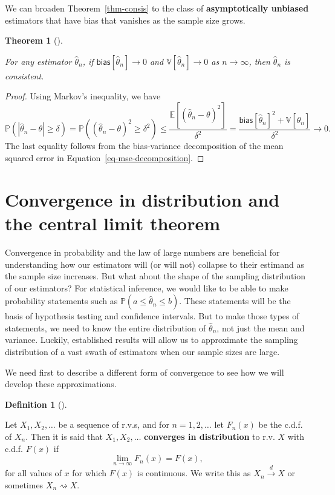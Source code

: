 \documentclass[
  13pt,
  letterpaper,
  DIV=11,
  numbers=noendperiod]{scrreprt}
\newcommand{\E}{\mathbb{E}}
\newcommand{\V}{\mathbb{V}}
\renewcommand{\P}{\mathbb{P}}
\newcommand{\indist}{\overset{d}{\to}}
\theoremstyle{plain}
\newtheorem{theorem}{Theorem}[chapter]
\theoremstyle{plain}
\theoremstyle{definition}
\newtheorem{definition}{Definition}[chapter]
\theoremstyle{definition}
\theoremstyle{remark}
\begin{document}
We can broaden Theorem~\ref{thm-consis} to the class of
\textbf{asymptotically unbiased} estimators that have bias that vanishes
as the sample size grows.

\begin{theorem}[]\protect\hypertarget{thm-consis-2}{}\label{thm-consis-2}

For any estimator \(\widehat{\theta}_n\), if
\(\textsf{bias}[\widehat{\theta}_n] \to 0\) and
\(\V[\widehat{\theta}_n] \rightarrow 0\) as \(n\rightarrow \infty\),
then \(\widehat{\theta}_n\) is consistent.

\end{theorem}

\begin{proof}
Using Markov's inequality, we have \[
\P\left( |\widehat{\theta}_n - \theta| \geq \delta \right) = \P((\widehat{\theta}_n-\theta)^2 \geq \delta^2) \leq \frac{\E[(\widehat{\theta}_n - \theta)^2]}{\delta^2} = \frac{\textsf{bias}[\widehat{\theta}_n]^2 + \V[\widehat{\theta}_n]}{\delta^2} \to 0.
\] The last equality follows from the bias-variance decomposition of the
mean squared error in Equation~\ref{eq-mse-decomposition}.
\end{proof}

\section{Convergence in distribution and the central limit
theorem}\label{convergence-in-distribution-and-the-central-limit-theorem}

Convergence in probability and the law of large numbers are beneficial
for understanding how our estimators will (or will not) collapse to
their estimand as the sample size increases. But what about the shape of
the sampling distribution of our estimators? For statistical inference,
we would like to be able to make probability statements such as
\(\P(a \leq \widehat{\theta}_n \leq b)\). These statements will be the
basis of hypothesis testing and confidence intervals. But to make those
types of statements, we need to know the entire distribution of
\(\widehat{\theta}_n\), not just the mean and variance. Luckily,
established results will allow us to approximate the sampling
distribution of a vast swath of estimators when our sample sizes are
large.

We need first to describe a different form of convergence to see how we
will develop these approximations.

\begin{definition}[]\protect\hypertarget{def-indist}{}\label{def-indist}

Let \(X_1,X_2,\ldots\) be a sequence of r.v.s, and for
\(n = 1,2, \ldots\) let \(F_n(x)\) be the c.d.f. of \(X_n\). Then it is
said that \(X_1, X_2, \ldots\) \textbf{converges in distribution} to
r.v. \(X\) with c.d.f. \(F(x)\) if \[
\lim_{n\rightarrow \infty} F_n(x) = F(x),
\] for all values of \(x\) for which \(F(x)\) is continuous. We write
this as \(X_n \indist X\) or sometimes \(X_n \rightsquigarrow X\).

\end{definition}
\end{document}
